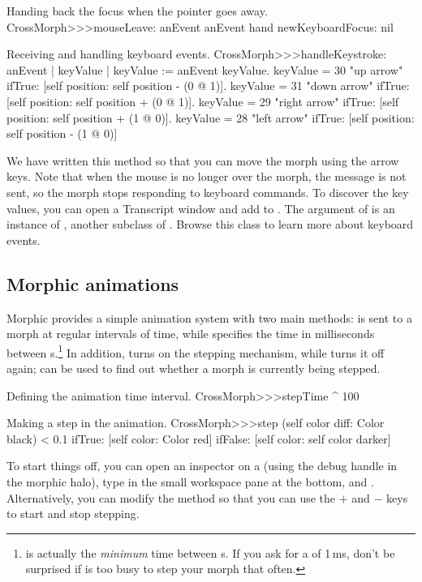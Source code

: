 \documentclass[a4paper,10pt,twoside]{book}
\begin{document}
\begin{method}{Handing back the focus when the pointer goes away.}
CrossMorph>>>mouseLeave: anEvent
	anEvent hand newKeyboardFocus: nil
\end{method}

\begin{method}[handleKeystroke]{Receiving and handling keyboard events.}
CrossMorph>>>handleKeystroke: anEvent
	| keyValue |
	keyValue := anEvent keyValue.
	keyValue = 30	 "up arrow"
		ifTrue: [self position: self position - (0 @ 1)].
	keyValue = 31	 "down arrow"
		ifTrue: [self position: self position + (0 @ 1)].
	keyValue = 29	 "right arrow"
		ifTrue: [self position: self position + (1 @ 0)].
	keyValue = 28	 "left arrow"
		ifTrue: [self position: self position - (1 @ 0)]
\end{method}

We have written this method so that you can move the morph using the arrow keys.
Note that when the mouse is no longer over the morph, the  message is not sent, so the morph stops responding to keyboard commands.
To discover the key values, you can open a Transcript window and add   to .
The  argument of  is an instance of , another subclass of . Browse this class to learn more about keyboard events.

\subsection{Morphic animations}

Morphic provides a simple animation system with two main methods:  is sent to a morph at regular intervals of time, while  specifies the time in milliseconds between s.\footnote{ is actually the \emph{minimum} time between s.   If you ask for a  of 1\,ms, don't be surprised if \pharo is too busy to step your morph that often.}
In addition, 
 turns on the stepping mechanism, while  turns it off again;   can be used to find out whether a morph is currently being stepped.

\begin{method}{Defining the animation time interval.}
CrossMorph>>>stepTime
	^ 100
\end{method}
\begin{method}{Making a step in the animation.}
CrossMorph>>>step
	(self color diff: Color black) < 0.1
		ifTrue: [self color: Color red]
		ifFalse: [self color: self color darker]
\end{method}
\noindent
To start things off, you can open an inspector on a  (using the debug handle \debugHandle{} in the morphic halo), type  in the small workspace pane at the bottom, and  .
Alternatively, you can modify the  method so that you can use the $+$ and $-$ keys to start and stop stepping. 
\end{document}
